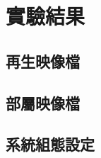 \chapter{實驗結果}
\label{c:experiment}
\section{再生映像檔}


\section{部屬映像檔}

\section{系統組態設定}


\begin{comment}
\section{描述性統計}
本研究各變數實驗結果之描述性統計(個數、最小值、最大值、平均與標準差)如表~。



\section{實驗結果分析}

如表~\ref{4-4}，以雙獨立樣本t檢定檢驗...







如表~\ref{4-9}所示...


\end{comment}
